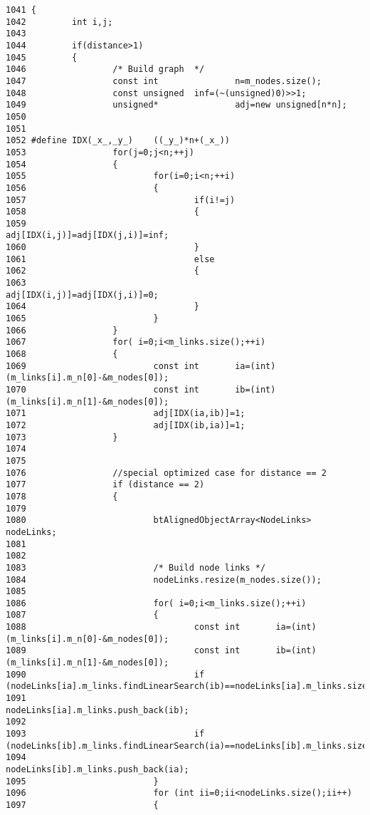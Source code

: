 \begin{Code}\begin{verbatim}1041 {
1042         int i,j;
1043 
1044         if(distance>1)
1045         {
1046                 /* Build graph  */ 
1047                 const int               n=m_nodes.size();
1048                 const unsigned  inf=(~(unsigned)0)>>1;
1049                 unsigned*               adj=new unsigned[n*n];
1050                 
1051 
1052 #define IDX(_x_,_y_)    ((_y_)*n+(_x_))
1053                 for(j=0;j<n;++j)
1054                 {
1055                         for(i=0;i<n;++i)
1056                         {
1057                                 if(i!=j)
1058                                 {
1059                                         adj[IDX(i,j)]=adj[IDX(j,i)]=inf;
1060                                 }
1061                                 else
1062                                 {
1063                                         adj[IDX(i,j)]=adj[IDX(j,i)]=0;
1064                                 }
1065                         }
1066                 }
1067                 for( i=0;i<m_links.size();++i)
1068                 {
1069                         const int       ia=(int)(m_links[i].m_n[0]-&m_nodes[0]);
1070                         const int       ib=(int)(m_links[i].m_n[1]-&m_nodes[0]);
1071                         adj[IDX(ia,ib)]=1;
1072                         adj[IDX(ib,ia)]=1;
1073                 }
1074 
1075 
1076                 //special optimized case for distance == 2
1077                 if (distance == 2)
1078                 {
1079 
1080                         btAlignedObjectArray<NodeLinks> nodeLinks;
1081 
1082 
1083                         /* Build node links */
1084                         nodeLinks.resize(m_nodes.size());
1085 
1086                         for( i=0;i<m_links.size();++i)
1087                         {
1088                                 const int       ia=(int)(m_links[i].m_n[0]-&m_nodes[0]);
1089                                 const int       ib=(int)(m_links[i].m_n[1]-&m_nodes[0]);
1090                                 if (nodeLinks[ia].m_links.findLinearSearch(ib)==nodeLinks[ia].m_links.size())
1091                                         nodeLinks[ia].m_links.push_back(ib);
1092 
1093                                 if (nodeLinks[ib].m_links.findLinearSearch(ia)==nodeLinks[ib].m_links.size())
1094                                         nodeLinks[ib].m_links.push_back(ia);
1095                         }
1096                         for (int ii=0;ii<nodeLinks.size();ii++)
1097                         {

\end{verbatim}
\end{Code}

